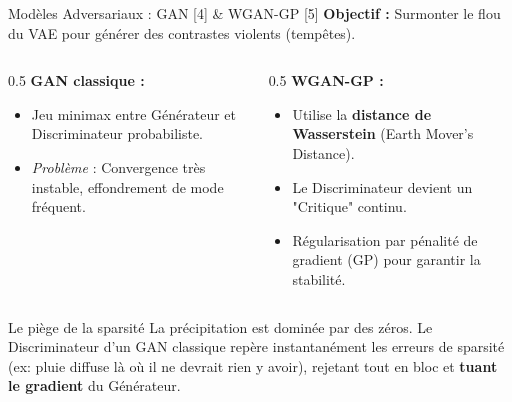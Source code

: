 \documentclass[10pt, aspectratio=169]{beamer}
\begin{document}
\begin{frame}{Modèles Adversariaux : GAN [4] \& WGAN-GP [5]}
    \textbf{Objectif :} Surmonter le flou du VAE pour générer des contrastes violents (tempêtes).
    \vspace{0.4cm}
    \begin{columns}
        \begin{column}{0.5\textwidth}
            \textbf{GAN classique :}
            \begin{itemize}
                \item Jeu minimax entre Générateur et Discriminateur probabiliste.
                \item \textit{Problème} : Convergence très instable, effondrement de mode fréquent.
            \end{itemize}
        \end{column}
        \begin{column}{0.5\textwidth}
            \textbf{WGAN-GP :}
            \begin{itemize}
                \item Utilise la \textbf{distance de Wasserstein} (Earth Mover's Distance).
                \item Le Discriminateur devient un "Critique" continu.
                \item Régularisation par pénalité de gradient (GP) pour garantir la stabilité.
            \end{itemize}
        \end{column}
    \end{columns}
    \vspace{0.4cm}
    \begin{alertblock}{Le piège de la sparsité}
        La précipitation est dominée par des zéros. Le Discriminateur d'un GAN classique repère instantanément les erreurs de sparsité (ex: pluie diffuse là où il ne devrait rien y avoir), rejetant tout en bloc et \textbf{tuant le gradient} du Générateur.
    \end{alertblock}
\end{frame}
\end{document}
